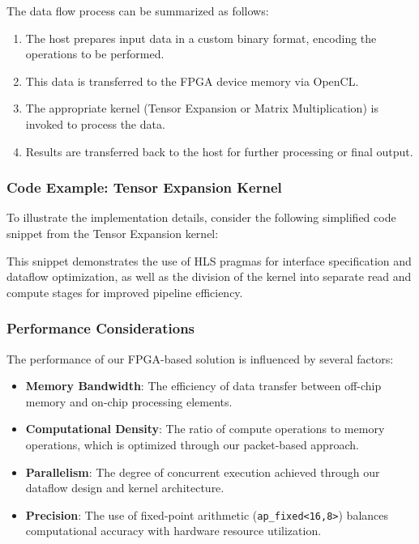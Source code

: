 \documentclass[12pt,oneside,a4paper]{article}
\begin{document}
The data flow process can be summarized as follows:

\begin{enumerate}
    \item The host prepares input data in a custom binary format, encoding the operations to be performed.
    \item This data is transferred to the FPGA device memory via OpenCL.
    \item The appropriate kernel (Tensor Expansion or Matrix Multiplication) is invoked to process the data.
    \item Results are transferred back to the host for further processing or final output.
\end{enumerate}

\subsubsection{Code Example: Tensor Expansion Kernel}

To illustrate the implementation details, consider the following simplified code snippet from the Tensor Expansion kernel:

This snippet demonstrates the use of HLS pragmas for interface specification and dataflow optimization, as well as the division of the kernel into separate read and compute stages for improved pipeline efficiency.

\subsubsection{Performance Considerations}

The performance of our FPGA-based solution is influenced by several factors:

\begin{itemize}
    \item \textbf{Memory Bandwidth}: The efficiency of data transfer between off-chip memory and on-chip processing elements.
    \item \textbf{Computational Density}: The ratio of compute operations to memory operations, which is optimized through our packet-based approach.
    \item \textbf{Parallelism}: The degree of concurrent execution achieved through our dataflow design and kernel architecture.
    \item \textbf{Precision}: The use of fixed-point arithmetic (\texttt{ap\_fixed<16,8>}) balances computational accuracy with hardware resource utilization.
\end{itemize}
\end{document}
